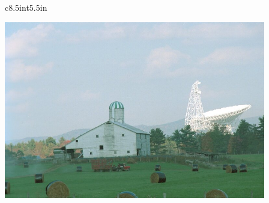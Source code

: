 \documentclass{book}
\begin{document}

\newpage
\appendix



% 

\printnoidxglossaries




\newpage
\thispagestyle{empty}
\hphantom{foo}

\newpage
\thispagestyle{empty}
\hphantom{foo}

\newpage
\thispagestyle{empty}

\colorbox{coverpages}{
\begin{FrameCover}{c}{8.5in}{t}{5.5in}

\begin{center}
\FramePix[c]{4.5in}
{\bfseries \includegraphics[width=4.5in,bb=0 0 796 540]{telescopes-1867.jpg} }
\end{center}


\end{FrameCover}
}
\end{document}
